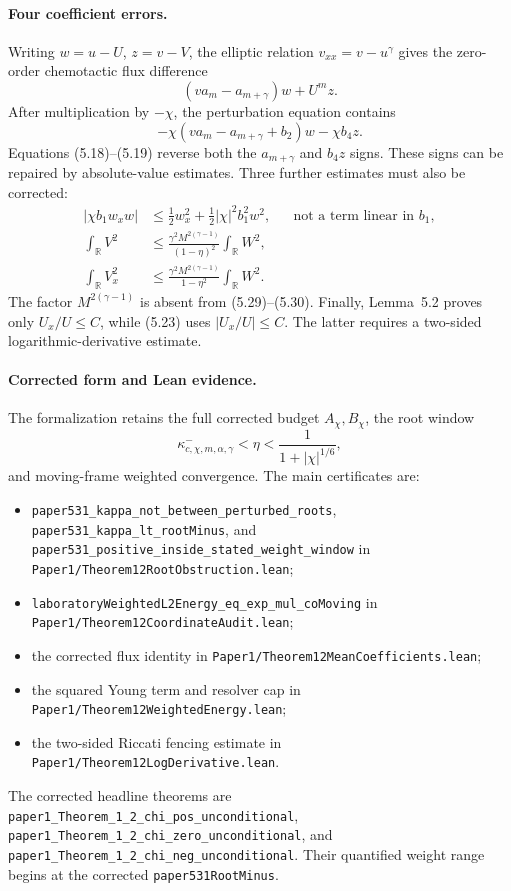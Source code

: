\documentclass[11pt]{article}
\newcommand{\R}{\mathbb{R}}
\newcommand{\abs}[1]{\left\lvert #1\right\rvert}
\newcommand{\code}[1]{\nolinkurl{#1}}
\begin{document}
\paragraph{Four coefficient errors.}
Writing \(w=u-U\), \(z=v-V\), the elliptic relation
\(v_{xx}=v-u^\gamma\) gives the zero-order chemotactic flux difference
\[
  (v a_m-a_{m+\gamma})w+U^m z.
\]
After multiplication by \(-\chi\), the perturbation equation contains
\[
 -\chi(v a_m-a_{m+\gamma}+b_2)w-\chi b_4z.
\]
Equations (5.18)--(5.19) reverse both the \(a_{m+\gamma}\) and \(b_4z\)
signs.  These signs can be repaired by absolute-value estimates.  Three
further estimates must also be corrected:
\begin{align*}
 \abs{\chi b_1 w_xw}
   &\le \frac12w_x^2+\frac12\abs{\chi}^2b_1^2w^2,
   &&\text{not a term linear in \(b_1\)},\\
 \int_\R V^2
   &\le \frac{\gamma^2M^{2(\gamma-1)}}{(1-\eta)^2}\int_\R W^2,\\
 \int_\R V_x^2
   &\le \frac{\gamma^2M^{2(\gamma-1)}}{1-\eta^2}\int_\R W^2.
\end{align*}
The factor \(M^{2(\gamma-1)}\) is absent from (5.29)--(5.30).  Finally,
Lemma~5.2 proves only \(U_x/U\le C\), while (5.23) uses
\(\abs{U_x/U}\le C\).  The latter requires a two-sided logarithmic-derivative
estimate.

\paragraph{Corrected form and Lean evidence.}
The formalization retains the full corrected budget \(A_\chi,B_\chi\), the
root window
\[
  \kappa^-_{c,\chi,m,\alpha,\gamma}<\eta
  <\frac{1}{1+\abs{\chi}^{1/6}},
\]
and moving-frame weighted convergence.  The main certificates are:
\begin{itemize}[leftmargin=2em]
\item \code{paper531_kappa_not_between_perturbed_roots},
  \code{paper531_kappa_lt_rootMinus}, and
  \code{paper531_positive_inside_stated_weight_window} in
  \code{Paper1/Theorem12RootObstruction.lean};
\item \code{laboratoryWeightedL2Energy_eq_exp_mul_coMoving} in
  \code{Paper1/Theorem12CoordinateAudit.lean};
\item the corrected flux identity in
  \code{Paper1/Theorem12MeanCoefficients.lean};
\item the squared Young term and resolver cap in
  \code{Paper1/Theorem12WeightedEnergy.lean};
\item the two-sided Riccati fencing estimate in
  \code{Paper1/Theorem12LogDerivative.lean}.
\end{itemize}
The corrected headline theorems are
\code{paper1_Theorem_1_2_chi_pos_unconditional},
\code{paper1_Theorem_1_2_chi_zero_unconditional}, and
\code{paper1_Theorem_1_2_chi_neg_unconditional}.  Their quantified weight
range begins at the corrected \code{paper531RootMinus}.
\end{document}
